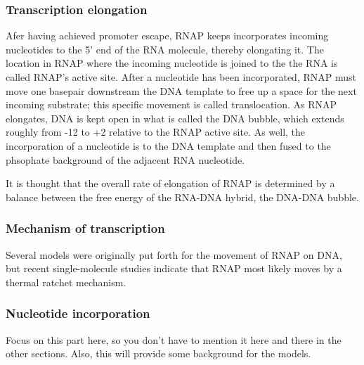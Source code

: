 \subsubsection{Transcription elongation}
Afer having achieved promoter escape, RNAP keeps incorporates incoming
nucleotides to the 5' end of the RNA molecule, thereby elongating it. The
location in RNAP where the incoming nucleotide is joined to the the RNA is
called RNAP's active site. After a nucleotide has been incorporated, RNAP must
move one basepair downstream the DNA template to free up a space for the next
incoming substrate; this specific movement is called translocation. As RNAP
elongates, DNA is kept open in what is called the DNA bubble, which extends
roughly from -12 to +2 relative to the RNAP active site. As well, the
incorporation of a nucleotide is to the DNA template and then fused to the
phsophate background of the adjacent RNA nucleotide.

It is thought that the overall rate of elongation of
RNAP is determined by a balance between the free energy of the RNA-DNA hybrid,
the DNA-DNA bubble.

\subsubsection{Mechanism of transcription}
Several models were originally put forth for the movement of RNAP on DNA, but
recent single-molecule studies indicate that RNAP most likely moves by a
thermal ratchet mechanism.


\subsubsection{Nucleotide incorporation}
Focus on this part here, so you don't have to mention it here and there in the
other sections. Also, this will provide some background for the models.

